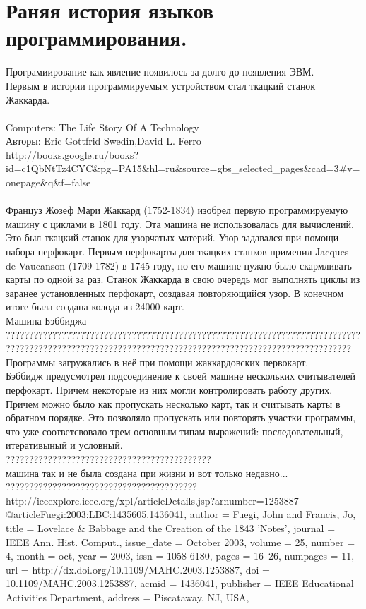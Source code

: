 \section{Раняя история языков программирования.}
Програмиирование как явление появилось за долго до появления ЭВМ.\\
Первым в истории программируемым устройством стал ткацкий станок Жаккарда.\\
\\
Computers: The Life Story Of A Technology\\
 Авторы: Eric Gottfrid Swedin,David L. Ferro\\
 http://books.google.ru/books?id=c1QbNtTz4CYC\&pg=PA15\&hl=ru\&source=gbs\_selected\_pages\&cad=3\#v=onepage\&q\&f=false\\
\\
Француз Жозеф Мари Жаккард (1752-1834) изобрел первую программируемую машину с циклами в 1801 году. Эта машина не использовалась для вычислений. 
Это был ткацкий станок для узорчатых материй. Узор задавался при помощи набора перфокарт. Первым перфокарты для ткацких станков применил 
Jacques de Vaucanson (1709-1782) в 1745 году, но его машине нужно было скармливать карты по одной за раз. Станок Жаккарда в свою очередь
мог выполнять циклы из заранее установленных перфокарт, создавая повторяющийся узор. В конечном итоге была создана колода из 24000 карт.\\
Машина Бэббиджа\\
????????????????????????????????????????????????????????????????????????????\\
??????????????????????????????????????????????????????????????????????????\\
Программы загружались в неё при помощи жаккардовских первокарт. \\
Бэббидж предусмотрел подсоединение к своей машине нескольких считывателей перфокарт. Причем некоторые из них могли контролировать работу других. 
Причем можно было как пропускать несколько карт, так и считывать карты в обратном порядке. Это позволяло пропускать или повторять участки программы, что
уже соответсвовало трем основным типам выражений: последовательный, итеративыный и условный. \\
????????????????????????????????????????????\\
машина так и не была создана при жизни и вот только недавно...
?????????????????????????????????????????\\
http://ieeexplore.ieee.org/xpl/articleDetails.jsp?arnumber=1253887\\
@article{Fuegi:2003:LBC:1435605.1436041,
 author = {Fuegi, John and Francis, Jo},
 title = {Lovelace \& Babbage and the Creation of the 1843 'Notes'},
 journal = {IEEE Ann. Hist. Comput.},
 issue_date = {October 2003},
 volume = {25},
 number = {4},
 month = oct,
 year = {2003},
 issn = {1058-6180},
 pages = {16--26},
 numpages = {11},
 url = {http://dx.doi.org/10.1109/MAHC.2003.1253887},
 doi = {10.1109/MAHC.2003.1253887},
 acmid = {1436041},
 publisher = {IEEE Educational Activities Department},
 address = {Piscataway, NJ, USA},
} 

